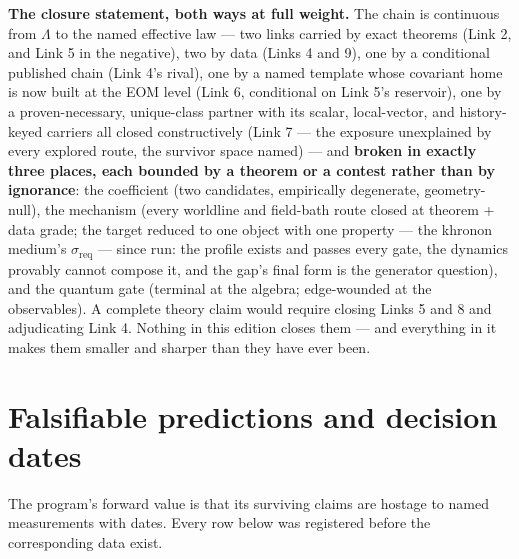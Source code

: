 \documentclass[11pt,a4paper]{article}
\begin{document}
\textbf{The closure statement, both ways at full weight.} The chain is continuous from $\Lambda$ to the named effective law --- two links carried by exact theorems (Link 2, and Link 5 in the negative), two by data (Links 4 and 9), one by a conditional published chain (Link 4's rival), one by a named template whose covariant home is now built at the EOM level (Link 6, conditional on Link 5's reservoir), one by a proven-necessary, unique-class partner with its scalar, local-vector, and history-keyed carriers all closed constructively (Link 7 --- the exposure unexplained by every explored route, the survivor space named) --- and \textbf{broken in exactly three places, each bounded by a theorem or a contest rather than by ignorance}: the coefficient (two candidates, empirically degenerate, geometry-null), the mechanism (every worldline and field-bath route closed at theorem + data grade; the target reduced to one object with one property --- the khronon medium's $\sigma_{\mathrm{req}}$ --- since run: the profile exists and passes every gate, the dynamics provably cannot compose it, and the gap's final form is the generator question), and the quantum gate (terminal at the algebra; edge-wounded at the observables). A complete theory claim would require closing Links 5 and 8 and adjudicating Link 4. Nothing in this edition closes them --- and everything in it makes them smaller and sharper than they have ever been.

\section{Falsifiable predictions and decision dates}

The program's forward value is that its surviving claims are hostage to named measurements with dates. Every row below was registered before the corresponding data exist.
\end{document}
